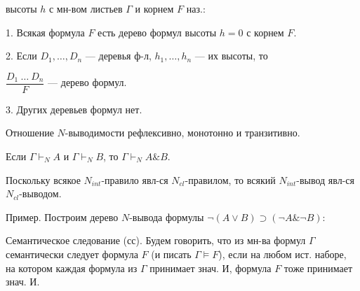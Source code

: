 
\shapka
{}
\opr {} высоты $h$ с мн-вом листьев $\Gamma$ и корнем $F$ наз.:\par
1. Всякая формула $F$ есть дерево формул высоты $h=0$ с корнем $F$.\par
2. Если $D_1,\dots,D_n$ --- деревья ф-л, $h_1,\dots,h_n$ --- их высоты, то\par
\hspace*{20mm}$\dfrac{D_1\ \dots\ D_n}{F}$ --- дерево формул.\par
3. Других деревьев формул нет.\par
{} Отношение $N$-выводимости рефлексивно, монотонно и транзитивно.\par
{} Если $\Gamma\vdash_N A$ и $\Gamma\vdash_N B$, то $\Gamma\vdash_N A\&B$.\par
\dvo Поскольку всякое $N_{int}$-правило явл-ся $N_{cl}$-правилом, то всякий $N_{int}$-вывод явл-ся $N_{cl}$-выводом. \ctd\par
Пример. Построим дерево $N$-вывода формулы $\neg(A\vee B)\supset(\neg A\&\neg B)$:\par
\begin{prooftree}\end{prooftree}
Семантическое следование (сс). Будем говорить, что из мн-ва формул $\Gamma$ семантически следует формула $F$ (и писать $\Gamma\models F$), если на любом ист. наборе, на котором каждая формула из $\Gamma$ принимает знач. И, формула $F$ тоже принимает знач. И.\par
{}\par

